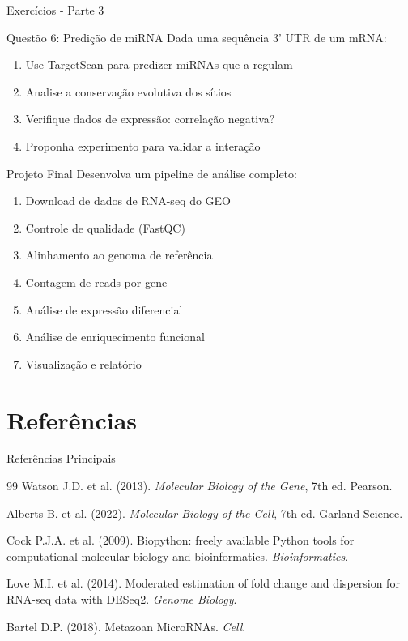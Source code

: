 \begin{frame}[allowframebreaks]{Exercícios - Parte 3}
\begin{block}{Questão 6: Predição de miRNA}
Dada uma sequência 3' UTR de um mRNA:
\begin{enumerate}
    \item Use TargetScan para predizer miRNAs que a regulam
    \item Analise a conservação evolutiva dos sítios
    \item Verifique dados de expressão: correlação negativa?
    \item Proponha experimento para validar a interação
\end{enumerate}
\end{block}

\vspace{0.3cm}

\begin{alertblock}{Projeto Final}
Desenvolva um pipeline de análise completo:
\begin{enumerate}
    \item Download de dados de RNA-seq do GEO
    \item Controle de qualidade (FastQC)
    \item Alinhamento ao genoma de referência
    \item Contagem de reads por gene
    \item Análise de expressão diferencial
    \item Análise de enriquecimento funcional
    \item Visualização e relatório
\end{enumerate}
\end{alertblock}
\end{frame}

\section{Referências}

\begin{frame}[allowframebreaks]{Referências Principais}
\begin{thebibliography}{99}
 Watson J.D. et al. (2013). \textit{Molecular Biology of the Gene}, 7th ed. Pearson.

 Alberts B. et al. (2022). \textit{Molecular Biology of the Cell}, 7th ed. Garland Science.

 Cock P.J.A. et al. (2009). Biopython: freely available Python tools for computational molecular biology and bioinformatics. \textit{Bioinformatics}.

 Love M.I. et al. (2014). Moderated estimation of fold change and dispersion for RNA-seq data with DESeq2. \textit{Genome Biology}.

 Bartel D.P. (2018). Metazoan MicroRNAs. \textit{Cell}.
\end{thebibliography}
\end{frame}

